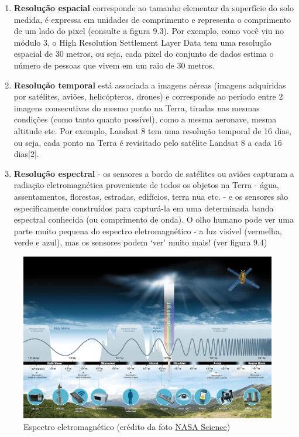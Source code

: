 \documentclass[
]{krantz}
\begin{document}
\begin{enumerate}
\def\labelenumi{\arabic{enumi}.}
\item
  \textbf{Resolução espacial} corresponde ao tamanho elementar da superfície do solo medida, é expressa em unidades de comprimento e representa o comprimento de um lado do pixel (consulte a figura 9.3). Por exemplo, como você viu no módulo 3, o High Resolution Settlement Layer Data tem uma resolução espacial de 30 metros, ou seja, cada pixel do conjunto de dados estima o número de pessoas que vivem em um raio de 30 metros.
\item
  \textbf{Resolução temporal} está associada a imagens aéreas (imagens adquiridas por satélites, aviões, helicópteros, drones) e corresponde ao período entre 2 imagens consecutivas do mesmo ponto na Terra, tiradas nas mesmas condições (como tanto quanto possível), como a mesma aeronave, mesma altitude etc. Por exemplo, Landsat 8 tem uma resolução temporal de 16 dias, ou seja, cada ponto na Terra é revisitado pelo satélite Landsat 8 a cada 16 dias{[}2{]}.
\item
  \textbf{Resolução espectral} - os sensores a bordo de satélites ou aviões capturam a radiação eletromagnética proveniente de todos os objetos na Terra - água, assentamentos, florestas, estradas, edifícios, terra nua etc. - e os sensores são especificamente construídos para capturá-la em uma determinada banda espectral conhecida (ou comprimento de onda). O olho humano pode ver uma parte muito pequena do espectro eletromagnético - a luz visível (vermelha, verde e azul), mas os sensores podem `ver' muito mais! (ver figura 9.4)
\end{enumerate}

\begin{figure}
\centering
\includegraphics{media/modulo9/fig94.png}
\caption{Espectro eletromagnético (crédito da foto \href{https://science.nasa.gov/ems/01_intro}{NASA Science})}
\end{figure}
\end{document}
